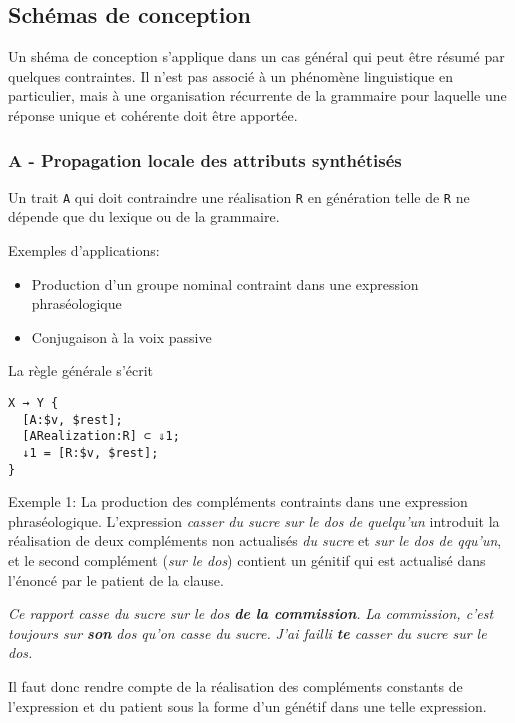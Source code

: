 \documentclass[11pt]{article}
\begin{document}
\subsection{Schémas de conception}

Un shéma de conception s'applique dans un cas général qui peut être
résumé par quelques contraintes. Il n'est pas associé à un phénomène
linguistique en particulier, mais à une organisation récurrente de la
grammaire pour laquelle une réponse unique et cohérente doit être apportée.

\subsubsection*{A - Propagation locale des attributs synthétisés}

Un trait \texttt{A} qui doit contraindre une réalisation \texttt{R} en
génération telle de \texttt{R} ne dépende que du
lexique ou de la grammaire.

Exemples d'applications:
\begin{itemize}
\item Production d'un groupe nominal contraint dans une expression
  phraséologique
\item Conjugaison à la voix passive
\end{itemize}

La règle générale s'écrit

\begin{lstlisting}
X → Y {
  [A:$v, $rest];
  [ARealization:R] ⊂ ⇓1;
  ↓1 = [R:$v, $rest];
}
\end{lstlisting}

Exemple 1:
La production des compléments contraints dans une expression
  phraséologique. L'expression \textit{casser du sucre sur le dos de
quelqu'un} introduit la réalisation de deux compléments non actualisés
\textit{du sucre} et \textit{sur le dos de qqu'un}, et le second
complément (\textit{sur le dos}) contient un génitif qui est actualisé
dans l'énoncé par le patient de la clause.

\begin{exe}
\ex \textit{Ce rapport casse du sucre sur le dos \textbf{de la commission}.}
\ex \textit{La commission, c'est toujours sur \textbf{son} dos qu'on casse du sucre.}
\ex \textit{J'ai failli \textbf{te} casser du sucre sur le dos.}
\end{exe}

Il faut donc rendre compte de la réalisation des compléments constants
de l'expression et du patient sous la forme
d'un génétif dans une telle expression.
\end{document}

